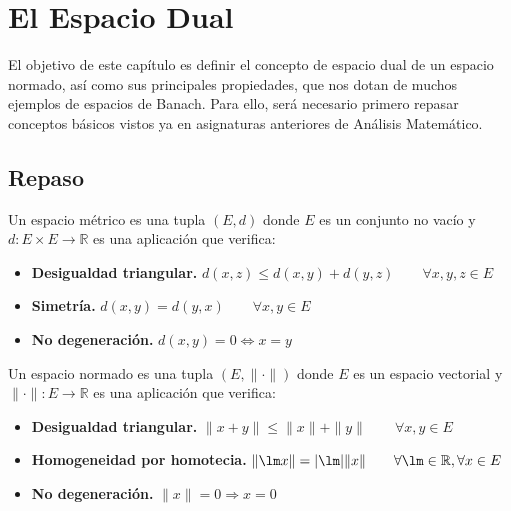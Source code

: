 \chapter{El Espacio Dual}
El objetivo de este capítulo es definir el concepto de espacio dual de un espacio normado, así como sus principales propiedades, que nos dotan de muchos ejemplos de espacios de Banach. Para ello, será necesario primero repasar conceptos básicos vistos ya en asignaturas anteriores de Análisis Matemático.

\section{Repaso}
\begin{definicion}
    Un espacio métrico es una tupla $(E, d)$ donde $E$ es un conjunto no vacío y $d:E\times E \to \mathbb{R}$ es una aplicación que verifica:
    \begin{itemize}
        \item \textbf{Desigualdad triangular.} $d(x,z) \leq d(x,y) + d(y,z) \qquad \forall x,y,z\in E$
        \item \textbf{Simetría.} $d(x,y) = d(y,x) \qquad \forall x,y\in E$
        \item \textbf{No degeneración.} $d(x,y) = 0 \Longleftrightarrow x = y$
    \end{itemize}
\end{definicion}

\begin{definicion}
    Un espacio normado es una tupla $(E, \|\cdot \|)$ donde $E$ es un espacio vectorial y $\|\cdot \|:E\to \mathbb{R}$ es una aplicación que verifica:
    \begin{itemize}
        \item \textbf{Desigualdad triangular.} $\|x + y\| \leq \|x\| + \|y\| \qquad \forall x,y\in E$
        \item \textbf{Homogeneidad por homotecia.} $\|\lm x\| = |\lm| \|x\| \qquad \forall \lm \in \mathbb{R}, \forall x\in E$
        \item \textbf{No degeneración.} $\|x\| = 0 \Longrightarrow x = 0$
    \end{itemize}
\end{definicion}

